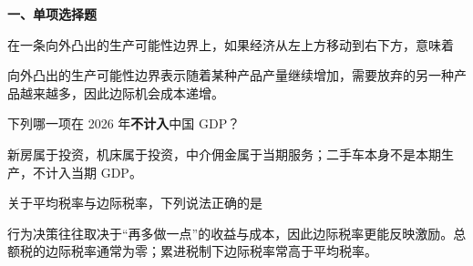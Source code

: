 ﻿


\textbf{一、单项选择题}

\begin{question}
在一条向外凸出的生产可能性边界上，如果经济从左上方移动到右下方，意味着
\begin{choiceoptions}[2]
\end{choiceoptions}
\begin{solution}
向外凸出的生产可能性边界表示随着某种产品产量继续增加，需要放弃的另一种产品越来越多，因此边际机会成本递增。
\end{solution}
\end{question}

\begin{question}
下列哪一项在 2026 年\textbf{不计入}中国 GDP？
\begin{choiceoptions}[2]
\end{choiceoptions}
\begin{solution}
新房属于投资，机床属于投资，中介佣金属于当期服务；二手车本身不是本期生产，不计入当期 GDP。
\end{solution}
\end{question}

\begin{question}
关于平均税率与边际税率，下列说法正确的是
\begin{choiceoptions}[2]
\end{choiceoptions}
\begin{solution}
行为决策往往取决于“再多做一点”的收益与成本，因此边际税率更能反映激励。总额税的边际税率通常为零；累进税制下边际税率常高于平均税率。
\end{solution}
\end{question}

